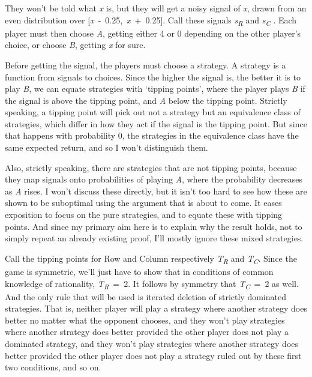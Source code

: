 \documentclass[
  11pt,
]{book}
\begin{document}
They won't be told what \emph{x} is, but they will get a noisy signal of \emph{x}, drawn from an even distribution over {[}\emph{x}~-~0.25,~\emph{x}~+~0.25{]}. Call these signals \emph{s\textsubscript{R}} and \emph{s\textsubscript{C}} . Each player must then choose \emph{A}, getting either 4 or 0 depending on the other player's choice, or choose \emph{B}, getting \emph{x} for sure.

Before getting the signal, the players must choose a strategy. A strategy is a function from signals to choices. Since the higher the signal is, the better it is to play \emph{B}, we can equate strategies with `tipping points', where the player plays \emph{B} if the signal is above the tipping point, and \emph{A} below the tipping point. Strictly speaking, a tipping point will pick out not a strategy but an equivalence class of strategies, which differ in how they act if the signal is the tipping point. But since that happens with probability 0, the strategies in the equivalence class have the same expected return, and so I won't distinguish them.

Also, strictly speaking, there are strategies that are not tipping points, because they map signals onto probabilities of playing \emph{A}, where the probability decreases as \emph{A} rises. I won't discuss these directly, but it isn't too hard to see how these are shown to be suboptimal using the argument that is about to come. It eases exposition to focus on the pure strategies, and to equate these with tipping points. And since my primary aim here is to explain why the result holds, not to simply repeat an already existing proof, I'll mostly ignore these mixed strategies.

Call the tipping points for Row and Column respectively \emph{T\textsubscript{R}} and \emph{T\textsubscript{C}}. Since the game is symmetric, we'll just have to show that in conditions of common knowledge of rationality, \emph{T\textsubscript{R}}~=~2. It follows by symmetry that \emph{T\textsubscript{C}}~=~2 as well. And the only rule that will be used is iterated deletion of strictly dominated strategies. That is, neither player will play a strategy where another strategy does better no matter what the opponent chooses, and they won't play strategies where another strategy does better provided the other player does not play a dominated strategy, and they won't play strategies where another strategy does better provided the other player does not play a strategy ruled out by these first two conditions, and so on.
\end{document}

